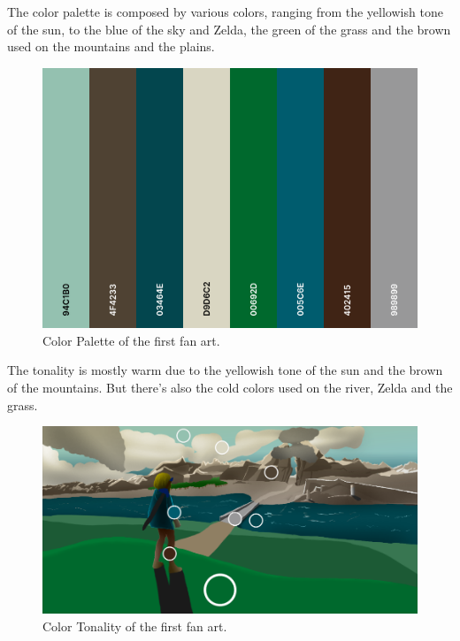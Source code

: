 \documentclass{cup-pan}
\begin{document}
            The color palette is composed by various colors, ranging from the yellowish tone of the sun, to the blue of the sky and Zelda, the green of the grass and the brown used on the mountains and the plains.\\
            \begin{figure}[H]
                \includegraphics[width=\textwidth]{Imagenes/Fanart1/Analysis/paleta.png}
                \caption{Color Palette of the first fan art.}
            \end{figure}

            The tonality is mostly warm due to the yellowish tone of the sun and the brown of the mountains. But there's also the cold colors used on the river, Zelda and the grass.\\
            \begin{figure}[H]
                \includegraphics[width=\textwidth]{Imagenes/Fanart1/Analysis/tonalidad.png}
                \caption{Color Tonality of the first fan art.}
            \end{figure}
\end{document}

